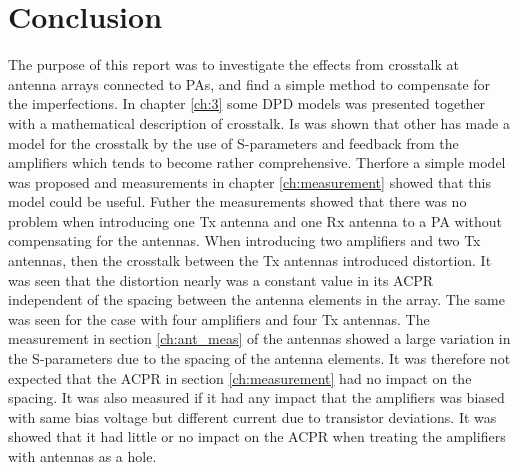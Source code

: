\chapter{Conclusion}\label{ch:conclusion}
The purpose of this report was to investigate the effects from crosstalk at antenna arrays connected to PAs, and find a simple method to compensate for the imperfections. In chapter \ref{ch:3} some DPD models was presented together with a mathematical description of crosstalk. Is was shown that other has made a model for the crosstalk by the use of S-parameters and feedback from the amplifiers which tends to become rather comprehensive. Therfore a simple model was proposed and measurements in chapter \ref{ch:measurement} showed that this model could be useful. Futher the measurements showed that there was no problem when introducing one Tx antenna and one Rx antenna to a PA without compensating for the antennas. When introducing two amplifiers and two Tx antennas, then the crosstalk between the Tx antennas introduced distortion. It was seen that the distortion nearly was a constant value in its ACPR independent of the spacing between the antenna elements in the array. The same was seen for the case with four amplifiers and four Tx antennas. The measurement in section \ref{ch:ant_meas} of the antennas showed a large variation in the S-parameters due to the spacing of the antenna elements. It was therefore not expected that the ACPR in section \ref{ch:measurement} had no impact on the spacing. It was also measured if it had any impact that the amplifiers was biased with same bias voltage but different current due to transistor deviations. It was showed that it had little or no impact on the ACPR when treating the amplifiers with antennas as a hole.     



